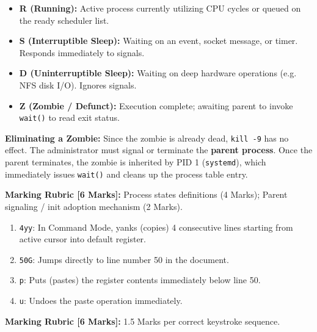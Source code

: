 \begin{examsol}
\begin{itemize}[leftmargin=1.5em]
    \item \textbf{R (Running):} Active process currently utilizing CPU cycles or queued on the ready scheduler list.
    \item \textbf{S (Interruptible Sleep):} Waiting on an event, socket message, or timer. Responds immediately to signals.
    \item \textbf{D (Uninterruptible Sleep):} Waiting on deep hardware operations (e.g. NFS disk I/O). Ignores signals.
    \item \textbf{Z (Zombie / Defunct):} Execution complete; awaiting parent to invoke \texttt{wait()} to read exit status.
\end{itemize}
\textbf{Eliminating a Zombie:} Since the zombie is already dead, \texttt{kill -9} has no effect. The administrator must signal or terminate the \textbf{parent process}. Once the parent terminates, the zombie is inherited by PID 1 (\texttt{systemd}), which immediately issues \texttt{wait()} and cleans up the process table entry.

\begin{markingrubric}
\textbf{Marking Rubric [6 Marks]:} Process states definitions (4 Marks); Parent signaling / init adoption mechanism (2 Marks).
\end{markingrubric}
\end{examsol}


\begin{examsol}
\begin{enumerate}[leftmargin=1.5em]
    \item \texttt{4yy}: In Command Mode, yanks (copies) 4 consecutive lines starting from active cursor into default register.
    \item \texttt{50G}: Jumps directly to line number 50 in the document.
    \item \texttt{p}: Puts (pastes) the register contents immediately below line 50.
    \item \texttt{u}: Undoes the paste operation immediately.
\end{enumerate}

\begin{markingrubric}
\textbf{Marking Rubric [6 Marks]:} 1.5 Marks per correct keystroke sequence.
\end{markingrubric}
\end{examsol}
